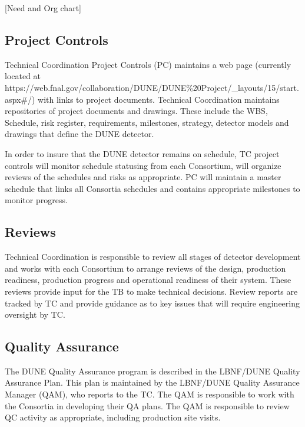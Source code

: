 [Need and Org chart]


\subsection{Project Controls}
\label{sec:fdsp-coord-controls}

Technical Coordination Project Controls (PC) maintains a web page
(currently located at
{https://web.fnal.gov/collaboration/DUNE/DUNE\%20Project/\_layouts/15/start.aspx\#/})
with links to project documents. Technical Coordination maintains
repositories of project documents and drawings. These include the WBS,
Schedule, risk register, requirements, milestones, strategy, detector
models and drawings that define the DUNE detector.

In order to insure that the DUNE detector remains on schedule, TC
project controls will monitor schedule statusing from each Consortium,
will organize reviews of the schedules and risks as appropriate. PC
will maintain a master schedule that links all Consortia schedules and
contains appropriate milestones to monitor progress.

\subsection{Reviews}
\label{sec:fdsp-coord-reviews}

Technical Coordination is responsible to review all stages of detector
development and works with each Consortium to arrange reviews of the
design, production readiness, production progress and operational
readiness of their system.  These reviews provide input for the TB to
make technical decisions.  Review reports are tracked by TC and
provide guidance as to key issues that will require engineering
oversight by TC.

\subsection{Quality Assurance}
\label{sec:fdsp-coord-qa}

The DUNE Quality Assurance program is described in the LBNF/DUNE
Quality Assurance Plan. This plan is maintained by the LBNF/DUNE
Quality Assurance Manager (QAM), who reports to the TC. The QAM is
responsible to work with the Consortia in developing their QA
plans. The QAM is responsible to review QC activity as appropriate,
including production site visits.

